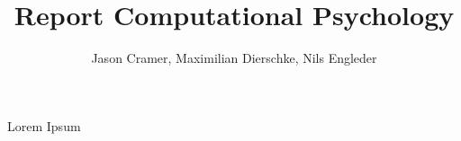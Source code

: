 \documentclass[]{scrartcl}
\title{Report Computational Psychology}
\author{Jason Cramer, Maximilian Dierschke, Nils Engleder}
\begin{document}
\maketitle
Lorem Ipsum 
\cite{Jern}
\nocite{*}
\printbibliography
\end{document}
